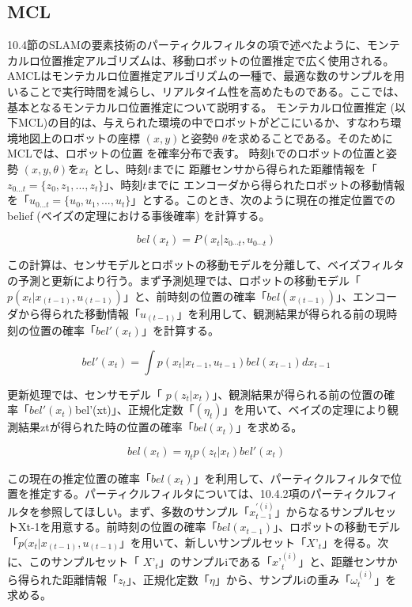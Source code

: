 \subsection{MCL}

10.4節のSLAMの要素技術のパーティクルフィルタの項で述べたように、モンテカルロ位置推定アルゴリズムは、移動ロボットの位置推定で広く使用される。AMCLはモンテカルロ位置推定アルゴリズムの一種で、最適な数のサンプルを用いることで実行時間を減らし、リアルタイム性を高めたものである。ここでは、基本となるモンテカルロ位置推定について説明する。
モンテカルロ位置推定 (以下MCL)の目的は、与えられた環境の中でロボットがどこにいるか、すなわち環境地図上のロボットの座標 $(x, y)$と姿勢θ $\theta$を求めることである。そのためにMCLでは、ロボットの位置 を確率分布で表す。
 時刻tでのロボットの位置と姿勢 $(x, y, \theta)$を$x_t$ とし、時刻$t$までに  距離センサから得られた距離情報を「 $z_{0...t} = \{z_0, z_1, ..., z_t\}$」、時刻$t$までに  エンコーダから得られたロボットの移動情報を「$u_{0...t} = \{u_0, u_1, ..., u_t\}$」とする。このとき、次のように現在の推定位置でのbelief (ベイズの定理における事後確率)  を計算する。

 \begin{equation}
   bel(x_t) = P(x_t|z_{0\cdots t},u_{0\cdots t})
 \end{equation}

この計算は、センサモデルとロボットの移動モデルを分離して、ベイズフィルタの予測と更新により行う。まず予測処理では、ロボットの移動モデル「 $p( x_t | x_{(t-1)}, u_{(t-1)} )$」と、前時刻の位置の確率「$bel(x_{(t-1)})$」、エンコーダから得られた移動情報「$u_{(t-1)}$」を利用して、観測結果が得られる前の現時刻の位置の確率「$bel'(x_t)$」を計算する。

\begin{equation}
  bel'(x_t) = \int p(x_t | x_{t-1},u_{t-1})bel(x_{t-1})dx_{t-1}
\end{equation}

更新処理では、センサモデル「 $p( z_t | x_t )$」、観測結果が得られる前の位置の確率「$bel'(x_t)$bel'(xt)」、正規化定数「$(\eta_t)$」を用いて、ベイズの定理により観測結果ztが得られた時の位置の確率「$bel(x_t)$」を求める。

\begin{equation}
  bel(x_t) = \eta_t p(z_t|x_t)bel'(x_t)
\end{equation}

この現在の推定位置の確率「$bel(x_t)$」を利用して、パーティクルフィルタで位置を推定する。パーティクルフィルタについては、10.4.2項のパーティクルフィルタを参照してほしい。まず、多数のサンプル「$x_{t-1}^{\prime(i)}$」からなるサンプルセットXt-1を用意する。前時刻の位置の確率「$bel(x_{t-1})$」、ロボットの移動モデル「$p( x_t | x_{(t-1)}, u_{(t-1)}$」を用いて、新しいサンプルセット「${X’}_t$」を得る。次に、このサンプルセット「 $X{’}_t$」のサンプルiである「${x’}_t^{(i)}$」と、距離センサから得られた距離情報「$z_t$」、正規化定数「$\eta$」から、サンプルiの重み「$\omega_t^{(i)}$」を求める。

